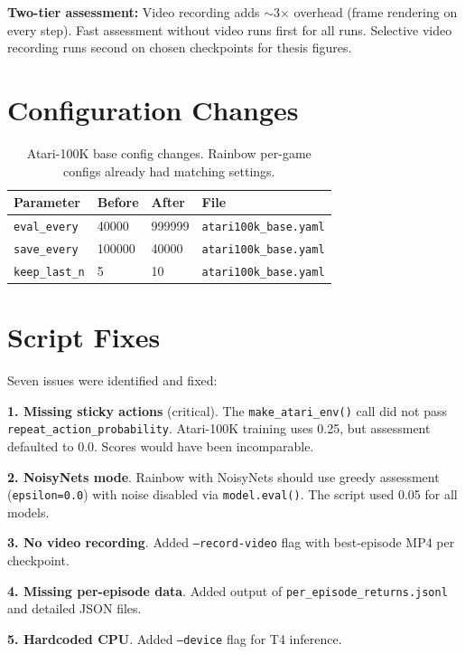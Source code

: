 \documentclass[11pt]{article}
\begin{document}
\textbf{Two-tier assessment:} Video recording adds
$\sim$3$\times$ overhead (frame rendering on every step). Fast
assessment without video runs first for all runs. Selective video
recording runs second on chosen checkpoints for thesis figures.


\section{Configuration Changes}

\begin{table}[H]
\centering
\small
\renewcommand{\arraystretch}{1.4}
\begin{tabular}{l l l l}
\toprule
\textbf{Parameter} & \textbf{Before} & \textbf{After}
  & \textbf{File} \\
\midrule
\texttt{eval\_every}   & 40000   & 999999
  & \texttt{atari100k\_base.yaml} \\
\texttt{save\_every}   & 100000  & 40000
  & \texttt{atari100k\_base.yaml} \\
\texttt{keep\_last\_n} & 5       & 10
  & \texttt{atari100k\_base.yaml} \\
\bottomrule
\end{tabular}
\caption{Atari-100K base config changes. Rainbow per-game configs
already had matching settings.}
\end{table}


\section{Script Fixes}

Seven issues were identified and fixed:

\medskip
\textbf{1. Missing sticky actions} (critical). The
\texttt{make\_atari\_env()} call did not pass
\texttt{repeat\_action\_probability}. Atari-100K training uses
0.25, but assessment defaulted to 0.0. Scores would have been
incomparable.

\medskip
\textbf{2. NoisyNets mode}. Rainbow with NoisyNets should use
greedy assessment (\texttt{epsilon=0.0}) with noise disabled via
\texttt{model.eval()}. The script used 0.05 for all models.

\medskip
\textbf{3. No video recording}. Added \texttt{--record-video}
flag with best-episode MP4 per checkpoint.

\medskip
\textbf{4. Missing per-episode data}. Added output of
\texttt{per\_episode\_returns.jsonl} and detailed JSON files.

\medskip
\textbf{5. Hardcoded CPU}. Added \texttt{--device} flag for T4
inference.
\end{document}
